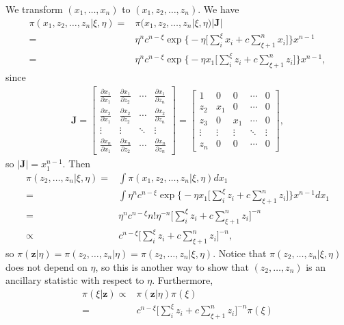 \documentclass{article}
\begin{document}
We transform $(x_1, \ldots, x_n)$ to $(x_1, z_2, \ldots, z_n)$.
We have
\begin{align*}
  \pi(x_1, z_2, \ldots, z_n | \xi, \eta)
  = & \pi(x_1, z_2, \ldots, z_n | \xi, \eta) |\bm{J}| \\
  = & \eta^n c^{n - \xi} \exp\big\{ -\eta\Big[\sum_i^\xi x_i + c \sum_{\xi+1}^n x_i\Big]\Big\} x^{n-1} \\
  = & \eta^n c^{n - \xi} \exp\big\{ -\eta x_1 \Big[\sum_i^\xi z_i + c \sum_{\xi+1}^n z_i\Big]\Big\} x^{n-1},
\end{align*}
since
\begin{align*}
  \bm{J}=
  \begin{bmatrix}
    \frac{\partial x_1}{\partial x_1} &  \frac{\partial x_1}{\partial z_2} & \cdots & \frac{\partial x_1}{\partial z_n} \\ 
    \frac{\partial x_2}{\partial x_1} &  \frac{\partial x_2}{\partial z_2} & \cdots & \frac{\partial x_2}{\partial z_n} \\ 
    \vdots & \vdots & \ddots & \vdots \\
    \frac{\partial x_n}{\partial x_1} &  \frac{\partial x_n}{\partial z_2} & \cdots & \frac{\partial x_n}{\partial z_n} 
  \end{bmatrix}
  =
  \begin{bmatrix}
    1 & 0 & 0 & \cdots & 0 \\
    z_2 & x_1 & 0 & \cdots & 0 \\
    z_3 & 0 & x_1 & \cdots & 0 \\
    \vdots & \vdots & \vdots & \ddots & \vdots \\
    z_n & 0 & 0 & \cdots & 0
  \end{bmatrix},
\end{align*}
so $|\bm{J}| = x_1^{n-1}$. 
Then 
\begin{align*}
  \pi(z_2, \ldots, z_n | \xi, \eta)
  = & \int \pi(x_1, z_2, \ldots, z_n | \xi, \eta) d x_1 \\
  = & \int \eta^n c^{n - \xi} \exp\big\{ -\eta x_1 \Big[\sum_i^\xi z_i + c \sum_{\xi+1}^n z_i\Big]\Big\} x^{n-1} d x_1  \\
  = & \eta^n c^{n-\xi} n! \eta^{-n} \Big[\sum_i^\xi z_i + c \sum_{\xi+1}^n z_i\Big]^{-n} \\
  \propto & c^{n-\xi} \Big[\sum_i^\xi z_i + c \sum_{\xi+1}^n z_i\Big]^{-n},
\end{align*}
so $\pi(\bm{z} | \eta) = \pi(z_2, \ldots, z_n | \eta) = \pi(z_2, \ldots, z_n | \xi, \eta)$.
Notice that $\pi(z_2, \ldots, z_n | \xi, \eta)$ does not depend on $\eta$,
so this is another way to show that $(z_2, \ldots, z_n)$ is an ancillary statistic with respect to $\eta$.
Furthermore,
\begin{align*}
  \pi(\xi|\bm{z})
  \propto & \pi(\bm{z} | \eta) \pi(\xi) \\
  = & c^{n-\xi} \Big[\sum_i^\xi z_i + c \sum_{\xi+1}^n z_i\Big]^{-n} \pi(\xi)
\end{align*}
\end{document}
